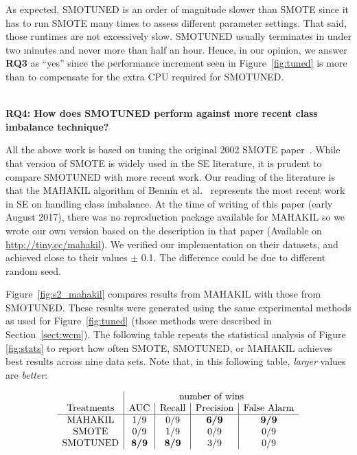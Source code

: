 \documentclass[sigconf]{acmart}
\theoremstyle{break}
\newcommand{\sma}{{\sc SMOTE}}
\newcommand{\smb}{{\sc SMOTUNED}}
\begin{document}
As expected,  {\smb} is an order of magnitude slower than {\sma} since
it has to run {\sma} many times to assess different parameter settings.
That said, those runtimes are not excessively slow.
{\smb} usually terminates in under two minutes and never more than half an hour.
Hence, in  our opinion, we answer {\bf RQ3} as ``yes'' since the   performance increment
seen in Figure~\ref{fig:tuned} is more than to compensate for the extra CPU required for {\smb}.

\noindent
{\bf \\RQ4: How does SMOTUNED perform against more recent class imbalance technique?}

All the above work is based on tuning the original 2002 {\sma} paper~\cite{chawla2002smote}. While that
version of {\sma} is widely used in the SE literature, 
it is prudent to compare {\smb} with more recent work.
Our reading
of the literature is that the MAHAKIL algorithm  of Bennin et al.~\cite{bennin2017mahakil} represents the most recent work in  SE on handling  
class imbalance.  
At the time of writing of this paper (early August 2017), there was no reproduction package available for MAHAKIL so we wrote our own version
based on the description in that paper (Available on \url{http://tiny.cc/mahakil}). We verified our implementation on their datasets, and achieved close to their values $\pm$ 0.1. The difference could be due to different random seed. 

Figure~\ref{fig:s2_mahakil} compares   results from MAHAKIL with those from {\smb}. These results
were generated using the same experimental methods as used for   Figure~\ref{fig:tuned} (those methods were described in  Section~\ref{sect:wcm}).
The following table repeats   the statistical analysis of Figure \ref{fig:stats} to report how often
  {\sma}, {\smb}, or MAHAKIL achieves best results across nine data sets.   Note that, in this following table, {\em larger} values are {\em better}:
  
\vspace{-0.4 cm}
{\small\[\begin{array}{*{20}{c|c|c|c|c}}
  & \multicolumn{4}{c}{\text{number of wins}}\\ 
    {\text{Treatments}} & {\text{AUC}} & {\text{Recall}} & {\text{Precision}}& {\text{False Alarm}}\\
    \hline
   {\text{MAHAKIL}} & 1/9 & 0/9 & \textbf{6/9} & \textbf{9/9}  \\
   {\text{SMOTE}}& 0/9 & 1/9 & 0/9 & 0/9 \\
   {\text{SMOTUNED}}& \textbf{8/9} & \textbf{8/9} & 3/9  & 0/9  \\
 \end{array} \]}
\vspace{-0.2 cm}
\end{document}
